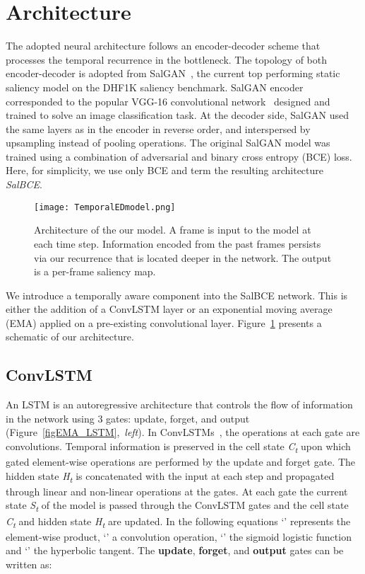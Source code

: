 \documentclass{bmvc2k}
\begin{document}
\section{Architecture}

The adopted neural architecture follows an encoder-decoder scheme that processes the temporal recurrence in the bottleneck. The topology of both encoder-decoder is adopted from SalGAN~\cite{Pan2017}, the current top performing static saliency model on the DHF1K saliency benchmark. SalGAN encoder corresponded to the popular VGG-16 convolutional network~\cite{VGG} designed and trained to solve an image classification task. At the decoder side, SalGAN used the same layers as in the encoder in reverse order, and interspersed by upsampling instead of pooling operations. The original SalGAN model was trained using a combination of adversarial and binary cross entropy (BCE) loss. Here, for simplicity, we use only BCE and term the resulting architecture \textit{SalBCE}.







\begin{figure}[t]
\begin{center}
\texttt{[image: TemporalEDmodel.png]}
\caption{Architecture of the our model. A frame is input to the model at each time step. Information encoded from the past frames persists via our recurrence that is located deeper in the network. The output is a per-frame saliency map.}
\label{fig:model_arch}
\end{center}
\end{figure}

We introduce a temporally aware component into the SalBCE network. This is either the addition of a ConvLSTM layer or an exponential moving average (EMA)  applied on a pre-existing convolutional layer. Figure~\ref{fig:model_arch} presents a schematic of our architecture.


\subsection{ConvLSTM}  An LSTM is an autoregressive architecture that controls the flow of information in the network using 3 gates: update, forget, and output (Figure~\ref{figEMA_LSTM},~\textit{left}). In ConvLSTMs~\cite{CLSTM}, the operations at each gate are convolutions. Temporal information is preserved in the cell state \textit{C\textsubscript{t}} upon which gated element-wise operations are performed by the update and forget gate. The hidden state \textit{H\textsubscript{t}} is concatenated with the input at each step and propagated through linear and non-linear operations at the gates. At each gate the current state \textit{S\textsubscript{t}} of the model is passed through the ConvLSTM gates and the cell state \textit{C\textsubscript{t}} and hidden state \textit{H\textsubscript{t}} are updated. In the following equations `' represents the element-wise product, `' a convolution operation, `' the sigmoid logistic function and `' the hyperbolic tangent. 
The \textbf{update}, \textbf{forget}, and \textbf{output} gates can be written as:
\end{document}
